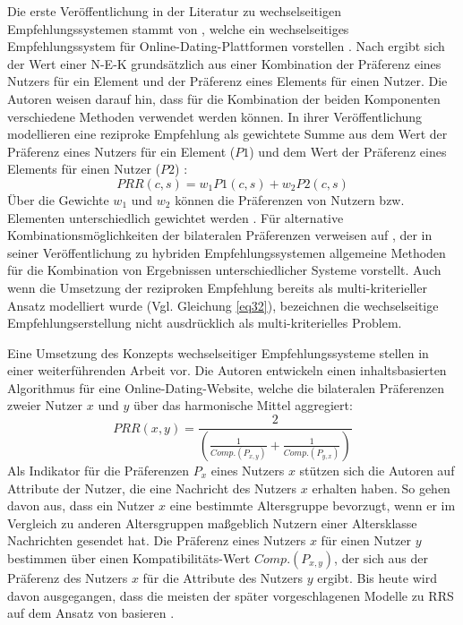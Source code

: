 Die erste Veröffentlichung in der Literatur zu wechselseitigen Empfehlungssystemen stammt von \textcite[S. 1ff.]{pizzato:inproceedings}, welche ein wechselseitiges Empfehlungssystem für Online-Dating-Plattformen vorstellen \cite[S. 1469]{yildirim:article}.
Nach \textcite[S. 5]{pizzato:inproceedings} ergibt sich der Wert einer \ac{N-E-K} grundsätzlich aus einer Kombination der Präferenz eines Nutzers für ein Element und der Präferenz eines Elements für einen Nutzer.
Die Autoren weisen darauf hin, dass für die Kombination der beiden Komponenten verschiedene Methoden verwendet werden können.
In ihrer Veröffentlichung modellieren \textcite[S. 6]{pizzato:inproceedings} eine reziproke Empfehlung als gewichtete Summe aus dem Wert der Präferenz eines Nutzers für ein Element ($P1$) und dem Wert der Präferenz eines Elements für einen Nutzer ($P2$) \cite[S. 6]{pizzato:inproceedings}:
\begin{equation}\label{eq32}
    PRR(c,s) = w_{1}P1(c,s) + w_{2}P2(c,s)
\end{equation}
Über die Gewichte $w_{1}$ und $w_{2}$ können die Präferenzen von Nutzern bzw. Elementen unterschiedlich gewichtet werden \cite[S. 6]{pizzato:inproceedings}.
Für alternative Kombinationsmöglichkeiten der bilateralen Präferenzen verweisen \textcite[S. 5]{pizzato:inproceedings} auf \textcite[S. 339ff.]{burke:article}, der in seiner Veröffentlichung zu hybriden Empfehlungssystemen allgemeine Methoden für die Kombination von Ergebnissen unterschiedlicher Systeme vorstellt.
Auch wenn die Umsetzung der reziproken Empfehlung bereits als multi-kriterieller Ansatz modelliert wurde (Vgl. Gleichung \ref{eq32}), bezeichnen \textcite[S. 1ff.]{pizzato:inproceedings} die wechselseitige Empfehlungserstellung nicht ausdrücklich als multi-kriterielles Problem. 

Eine Umsetzung des Konzepts wechselseitiger Empfehlungssysteme stellen \textcite[S. 207ff.]{pizzato:2010} in einer weiterführenden Arbeit vor.
Die Autoren entwickeln einen inhaltsbasierten Algorithmus für eine Online-Dating-Website, welche die bilateralen Präferenzen zweier Nutzer $x$ und $y$ über das harmonische Mittel aggregiert:
\begin{equation}\label{eq33}
    PRR(x,y) = \frac{2}{(\frac{1}{Comp.(P_{x,y})}+\frac{1}{Comp.(P_{y,x})})}
\end{equation}
Als Indikator für die Präferenzen $P_{x}$ eines Nutzers $x$ stützen sich die Autoren auf Attribute der Nutzer, die eine Nachricht des Nutzers $x$ erhalten haben.
So gehen \textcite[S. 210]{pizzato:2010} davon aus, dass ein Nutzer $x$ eine bestimmte Altersgruppe bevorzugt, wenn er im Vergleich zu anderen Altersgruppen maßgeblich Nutzern einer Altersklasse Nachrichten gesendet hat.
Die Präferenz eines Nutzers $x$ für einen Nutzer $y$ bestimmen \textcite[S. 210]{pizzato:2010} über einen Kompatibilitäts-Wert $Comp.(P_{x,y})$, der sich aus der Präferenz des Nutzers $x$ für die Attribute des Nutzers $y$ ergibt.
Bis heute wird davon ausgegangen, dass die meisten der später vorgeschlagenen Modelle zu \ac{RRS} auf dem Ansatz von \textcite[S. 207ff.]{pizzato:2010} basieren \cite[S. 723]{kumari:article}.

